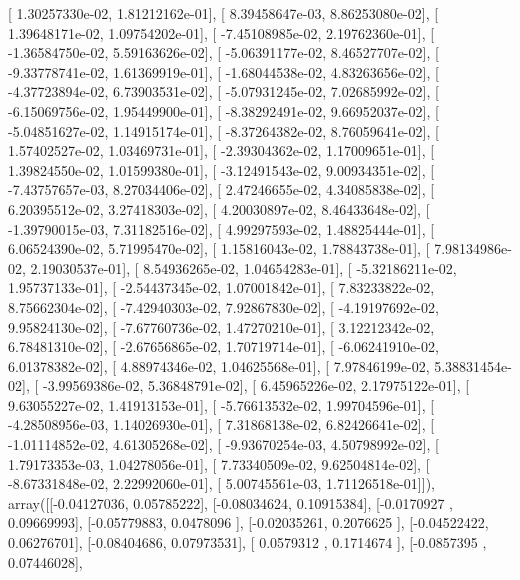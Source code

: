 \documentclass{article}
\begin{document}
       [  1.30257330e-02,   1.81212162e-01],
       [  8.39458647e-03,   8.86253080e-02],
       [  1.39648171e-02,   1.09754202e-01],
       [ -7.45108985e-02,   2.19762360e-01],
       [ -1.36584750e-02,   5.59163626e-02],
       [ -5.06391177e-02,   8.46527707e-02],
       [ -9.33778741e-02,   1.61369919e-01],
       [ -1.68044538e-02,   4.83263656e-02],
       [ -4.37723894e-02,   6.73903531e-02],
       [ -5.07931245e-02,   7.02685992e-02],
       [ -6.15069756e-02,   1.95449900e-01],
       [ -8.38292491e-02,   9.66952037e-02],
       [ -5.04851627e-02,   1.14915174e-01],
       [ -8.37264382e-02,   8.76059641e-02],
       [  1.57402527e-02,   1.03469731e-01],
       [ -2.39304362e-02,   1.17009651e-01],
       [  1.39824550e-02,   1.01599380e-01],
       [ -3.12491543e-02,   9.00934351e-02],
       [ -7.43757657e-03,   8.27034406e-02],
       [  2.47246655e-02,   4.34085838e-02],
       [  6.20395512e-02,   3.27418303e-02],
       [  4.20030897e-02,   8.46433648e-02],
       [ -1.39790015e-03,   7.31182516e-02],
       [  4.99297593e-02,   1.48825444e-01],
       [  6.06524390e-02,   5.71995470e-02],
       [  1.15816043e-02,   1.78843738e-01],
       [  7.98134986e-02,   2.19030537e-01],
       [  8.54936265e-02,   1.04654283e-01],
       [ -5.32186211e-02,   1.95737133e-01],
       [ -2.54437345e-02,   1.07001842e-01],
       [  7.83233822e-02,   8.75662304e-02],
       [ -7.42940303e-02,   7.92867830e-02],
       [ -4.19197692e-02,   9.95824130e-02],
       [ -7.67760736e-02,   1.47270210e-01],
       [  3.12212342e-02,   6.78481310e-02],
       [ -2.67656865e-02,   1.70719714e-01],
       [ -6.06241910e-02,   6.01378382e-02],
       [  4.88974346e-02,   1.04625568e-01],
       [  7.97846199e-02,   5.38831454e-02],
       [ -3.99569386e-02,   5.36848791e-02],
       [  6.45965226e-02,   2.17975122e-01],
       [  9.63055227e-02,   1.41913153e-01],
       [ -5.76613532e-02,   1.99704596e-01],
       [ -4.28508956e-03,   1.14026930e-01],
       [  7.31868138e-02,   6.82426641e-02],
       [ -1.01114852e-02,   4.61305268e-02],
       [ -9.93670254e-03,   4.50798992e-02],
       [  1.79173353e-03,   1.04278056e-01],
       [  7.73340509e-02,   9.62504814e-02],
       [ -8.67331848e-02,   2.22992060e-01],
       [  5.00745561e-03,   1.71126518e-01]]), array([[-0.04127036,  0.05785222],
       [-0.08034624,  0.10915384],
       [-0.0170927 ,  0.09669993],
       [-0.05779883,  0.0478096 ],
       [-0.02035261,  0.2076625 ],
       [-0.04522422,  0.06276701],
       [-0.08404686,  0.07973531],
       [ 0.0579312 ,  0.1714674 ],
       [-0.0857395 ,  0.07446028],
\end{document}
